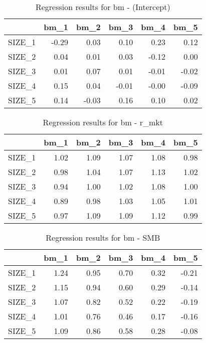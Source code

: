 \begin{table}[ht]
\centering
\caption{Regression results for bm - (Intercept)} 
\begin{tabular}{rrrrrr}
  \hline
 & bm\_1 & bm\_2 & bm\_3 & bm\_4 & bm\_5 \\ 
  \hline
SIZE\_1 & -0.29 & 0.03 & 0.10 & 0.23 & 0.12 \\ 
  SIZE\_2 & 0.04 & 0.01 & 0.03 & -0.12 & 0.00 \\ 
  SIZE\_3 & 0.01 & 0.07 & 0.01 & -0.01 & -0.02 \\ 
  SIZE\_4 & 0.15 & 0.04 & -0.01 & -0.00 & -0.09 \\ 
  SIZE\_5 & 0.14 & -0.03 & 0.16 & 0.10 & 0.02 \\ 
   \hline
\end{tabular}
\end{table}


\begin{table}[ht]
\centering
\caption{Regression results for bm - r_mkt} 
\begin{tabular}{rrrrrr}
  \hline
 & bm\_1 & bm\_2 & bm\_3 & bm\_4 & bm\_5 \\ 
  \hline
SIZE\_1 & 1.02 & 1.09 & 1.07 & 1.08 & 0.98 \\ 
  SIZE\_2 & 0.98 & 1.04 & 1.07 & 1.13 & 1.02 \\ 
  SIZE\_3 & 0.94 & 1.00 & 1.02 & 1.08 & 1.00 \\ 
  SIZE\_4 & 0.89 & 0.98 & 1.03 & 1.05 & 1.01 \\ 
  SIZE\_5 & 0.97 & 1.09 & 1.09 & 1.12 & 0.99 \\ 
   \hline
\end{tabular}
\end{table}


\begin{table}[ht]
\centering
\caption{Regression results for bm - SMB} 
\begin{tabular}{rrrrrr}
  \hline
 & bm\_1 & bm\_2 & bm\_3 & bm\_4 & bm\_5 \\ 
  \hline
SIZE\_1 & 1.24 & 0.95 & 0.70 & 0.32 & -0.21 \\ 
  SIZE\_2 & 1.15 & 0.94 & 0.60 & 0.29 & -0.14 \\ 
  SIZE\_3 & 1.07 & 0.82 & 0.52 & 0.22 & -0.19 \\ 
  SIZE\_4 & 1.01 & 0.76 & 0.46 & 0.17 & -0.16 \\ 
  SIZE\_5 & 1.09 & 0.86 & 0.58 & 0.28 & -0.08 \\ 
   \hline
\end{tabular}
\end{table}


